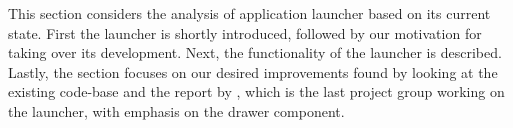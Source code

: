 This section considers the analysis of application launcher based on its current state.
First the launcher is shortly introduced, followed by our motivation for taking over its development.
Next, the functionality of the launcher is described.
Lastly, the section focuses on our desired improvements found by looking at the existing code-base and the report by \citet{launcher2012}, which is the last project group working on the launcher, with emphasis on the drawer component.